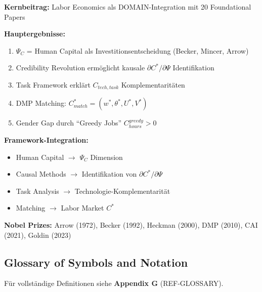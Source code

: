 \begin{tcolorbox}[colback=green!5!white, colframe=green!75!black, title=\textbf{Appendix AA Summary}]
\textbf{Kernbeitrag:} Labor Economics als DOMAIN-Integration mit 20 Foundational Papers

\textbf{Hauptergebnisse:}
\begin{enumerate}[noitemsep]
    \item $\Psi_C$ = Human Capital als Investitionsentscheidung (Becker, Mincer, Arrow)
    \item Credibility Revolution ermöglicht kausale $\partial C^*/\partial \Psi$ Identifikation
    \item Task Framework erklärt $C_{tech, task}$ Komplementaritäten
    \item DMP Matching: $C^*_{match} = (w^*, \theta^*, U^*, V^*)$
    \item Gender Gap durch ``Greedy Jobs'' $C_{hours}^{greedy} > 0$
\end{enumerate}

\textbf{Framework-Integration:}
\begin{itemize}[noitemsep]
    \item Human Capital $\to$ $\Psi_C$ Dimension
    \item Causal Methods $\to$ Identifikation von $\partial C^*/\partial \Psi$
    \item Task Analysis $\to$ Technologie-Komplementarität
    \item Matching $\to$ Labor Market $C^*$
\end{itemize}

\textbf{Nobel Prizes:} Arrow (1972), Becker (1992), Heckman (2000), DMP (2010), CAI (2021), Goldin (2023)
\end{tcolorbox}

\subsection{Glossary of Symbols and Notation}
\label{sec:aa-glossary}

Für vollständige Definitionen siehe \textbf{Appendix G} (REF-GLOSSARY).

